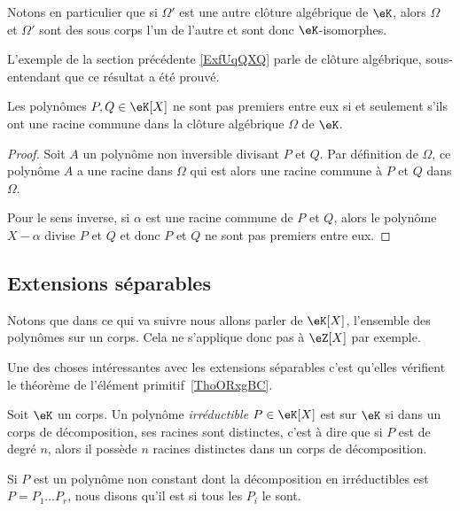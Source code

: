 Notons en particulier que si \( \Omega'\) est une autre clôture algébrique de \( \eK\), alors \( \Omega\) et \( \Omega'\) sont des sous corps l'un de l'autre et sont donc \( \eK\)-isomorphes.

\begin{probleme}
L'exemple de la section précédente \ref{ExfUqQXQ} parle de clôture algébrique, sous-entendant que ce résultat a été prouvé. 
\end{probleme}

\begin{lemma}
    Les polynômes \( P,Q\in \eK[X]\) ne sont pas premiers entre eux si et seulement s'ils ont une racine commune dans la clôture algébrique \( \Omega\) de \( \eK\).
\end{lemma}

\begin{proof}
    Soit \( A\) un polynôme non inversible divisant \( P\) et $Q$. Par définition de \( \Omega\), ce polynôme \( A\) a une racine dans \( \Omega\) qui est alors une racine commune à \( P\) et \( Q\) dans \( \Omega\).

    Pour le sens inverse, si \( \alpha\) est une racine commune de \( P\) et \( Q\), alors le polynôme \( X-\alpha\) divise \( P\) et \( Q\) et donc \( P\) et \( Q \) ne sont pas premiers entre eux.
\end{proof}


\subsection{Extensions séparables}

Notons que dans ce qui va suivre nous allons parler de \( \eK[X]\), l'ensemble des polynômes sur un corps. Cela ne s'applique donc pas à \( \eZ[X]\) par exemple.

Une des choses intéressantes avec les extensions séparables c'est qu'elles vérifient le théorème de l'élément primitif~\ref{ThoORxgBC}.

\begin{definition}      \label{DEFooLXSBooCHIUFU}
    Soit \( \eK\) un corps. Un polynôme \emph{irréductible} \( P\in \eK[X]\) est  sur $\eK$ si dans un corps de décomposition, ses racines sont distinctes, c'est à dire que si \( P\) est de degré \( n\), alors il possède \( n\) racines distinctes dans un corps de décomposition.

    Si \( P\) est un polynôme non constant dont la décomposition en irréductibles est \( P=P_1\ldots P_r\), nous disons qu'il est  si tous les \( P_i\) le sont.
\end{definition}

